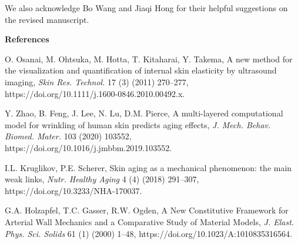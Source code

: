 \documentclass[11pt]{article}
\begin{document}
\noindent
We also acknowledge Bo Wang and Jiaqi Hong for their helpful
suggestions on the revised manuscript.

\vspace{0.5em}

\noindent\textbf{References}

\vspace{0.3em}

\begin{list}{}{%
  \setlength{\leftmargin}{2em}%
  \setlength{\itemindent}{-2em}%
  \setlength{\itemsep}{0.5em}%
  \setlength{\parsep}{0pt}%
}

\item [1] O. Osanai, M. Ohtsuka, M. Hotta, T. Kitaharai, Y.
Takema, A new method for the visualization and quantification
of internal skin elasticity by ultrasound imaging,
\emph{Skin Res. Technol.} 17 (3) (2011) 270--277,
https://doi.org/10.1111/j.1600-0846.2010.00492.x.

\item [2] Y. Zhao, B. Feng, J. Lee, N. Lu, D.M. Pierce, A
multi-layered computational model for wrinkling of human skin
predicts aging effects, \emph{J. Mech. Behav. Biomed. Mater.}
103 (2020) 103552, https://doi.org/10.1016/j.jmbbm.2019.103552.

\item [3] I.L. Kruglikov, P.E. Scherer, Skin aging as a
mechanical phenomenon: the main weak links, \emph{Nutr. Healthy
Aging} 4 (4) (2018) 291--307,
https://doi.org/10.3233/NHA-170037.

\item [4] G.A. Holzapfel, T.C. Gasser, R.W. Ogden, A New
Constitutive Framework for Arterial Wall Mechanics and a
Comparative Study of Material Models, \emph{J. Elast. Phys.
Sci. Solids} 61 (1) (2000) 1--48,
https://doi.org/10.1023/A:1010835316564.

\end{list}

\end{document}
